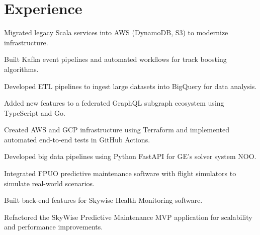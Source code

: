 \documentclass[]{pb-resume}
\begin{document}
\begin{minipage}[t]{0.66\textwidth} 

\section{Experience}

\vspace{10pt} %
\begin{tightemize}
\item Migrated legacy Scala services into AWS (DynamoDB, S3) to modernize infrastructure.
\item Built Kafka event pipelines and automated workflows for track boosting algorithms.
\item Developed ETL pipelines to ingest large datasets into BigQuery for data analysis.
\item Added new features to a federated GraphQL subgraph ecosystem using TypeScript and Go.
\item Created AWS and GCP infrastructure using Terraform and implemented automated end-to-end tests in GitHub Actions.
\end{tightemize}
\sectionsep

\vspace{0pt} %
\begin{tightemize}
\item Developed big data pipelines using Python FastAPI for GE's solver system NOO.
\item Integrated FPUO predictive maintenance software with flight simulators to simulate real-world scenarios.
\item Built back-end features for Skywise Health Monitoring software.
\item Refactored the SkyWise Predictive Maintenance MVP application for scalability and performance improvements.
\end{tightemize}
\sectionsep


\end{minipage}
\end{document}
